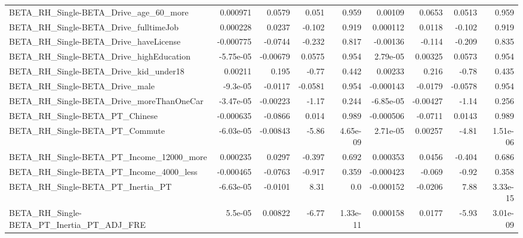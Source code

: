 \begin{tabular}{lrrrrrrrr}
BETA\_RH\_Single-BETA\_Drive\_age\_60\_more              &    0.000971 &       0.0579 &    0.051 &    0.959 &    0.00109 &      0.0653 &       0.0513 &         0.959 \\
BETA\_RH\_Single-BETA\_Drive\_fulltimeJob              &    0.000228 &       0.0237 &   -0.102 &    0.919 &   0.000112 &      0.0118 &       -0.102 &         0.919 \\
BETA\_RH\_Single-BETA\_Drive\_haveLicense              &   -0.000775 &      -0.0744 &   -0.232 &    0.817 &   -0.00136 &      -0.114 &       -0.209 &         0.835 \\
BETA\_RH\_Single-BETA\_Drive\_highEducation            &   -5.75e-05 &     -0.00679 &   0.0575 &    0.954 &   2.79e-05 &     0.00325 &       0.0573 &         0.954 \\
BETA\_RH\_Single-BETA\_Drive\_kid\_under18              &     0.00211 &        0.195 &    -0.77 &    0.442 &    0.00233 &       0.216 &        -0.78 &         0.435 \\
BETA\_RH\_Single-BETA\_Drive\_male                     &    -9.3e-05 &      -0.0117 &  -0.0581 &    0.954 &  -0.000143 &     -0.0179 &      -0.0578 &         0.954 \\
BETA\_RH\_Single-BETA\_Drive\_moreThanOneCar           &   -3.47e-05 &     -0.00223 &    -1.17 &    0.244 &  -6.85e-05 &    -0.00427 &        -1.14 &         0.256 \\
BETA\_RH\_Single-BETA\_PT\_Chinese                     &   -0.000635 &      -0.0866 &    0.014 &    0.989 &  -0.000506 &     -0.0711 &       0.0143 &         0.989 \\
BETA\_RH\_Single-BETA\_PT\_Commute                     &   -6.03e-05 &     -0.00843 &    -5.86 & 4.65e-09 &   2.71e-05 &     0.00257 &        -4.81 &      1.51e-06 \\
BETA\_RH\_Single-BETA\_PT\_Income\_12000\_more           &    0.000235 &       0.0297 &   -0.397 &    0.692 &   0.000353 &      0.0456 &       -0.404 &         0.686 \\
BETA\_RH\_Single-BETA\_PT\_Income\_4000\_less            &   -0.000465 &      -0.0763 &   -0.917 &    0.359 &  -0.000423 &      -0.069 &        -0.92 &         0.358 \\
BETA\_RH\_Single-BETA\_PT\_Inertia\_PT                  &   -6.63e-05 &      -0.0101 &     8.31 &      0.0 &  -0.000152 &     -0.0206 &         7.88 &      3.33e-15 \\
BETA\_RH\_Single-BETA\_PT\_Inertia\_PT\_ADJ\_FRE          &     5.5e-05 &      0.00822 &    -6.77 & 1.33e-11 &   0.000158 &      0.0177 &        -5.93 &      3.01e-09 \\

\end{tabular}
